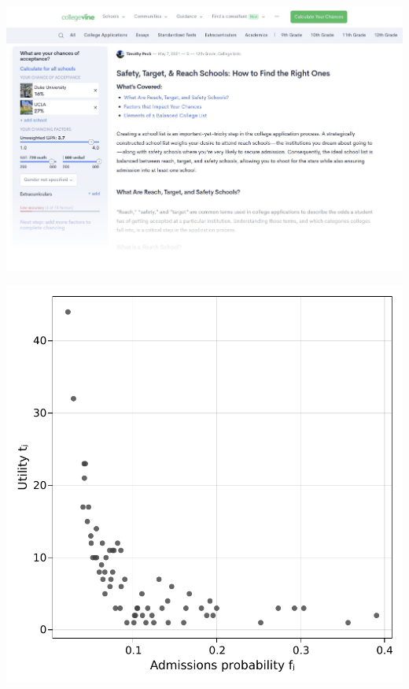 \documentclass[10pt,slidestop,compress,mathserif,notheorems]{beamer}
\newif\ifen
\theoremstyle{definition}
\theoremstyle{definition}
\begin{document}
\ifen \else
\begin{frame}[plain]{}
\begin{center}
\includegraphics[width=\textwidth]{plots/news-en.png}
\end{center}
\end{frame}
\fi




\begin{frame}[plain]{}
\begin{center}
\includegraphics[height=\textheight]{plots/samplemarket.pdf}
\end{center}
\end{frame}
\end{document}
